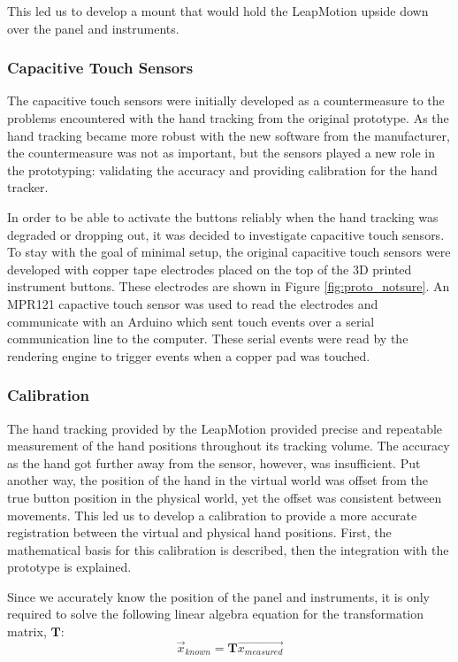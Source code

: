 This led us to develop a mount that would hold the LeapMotion upside down over the panel and instruments.

\subsubsection{Capacitive Touch Sensors}

The capacitive touch sensors were initially developed as a countermeasure to the problems encountered with the hand tracking from the original prototype.
As the hand tracking became more robust with the new software from the manufacturer, the countermeasure was not as important, but the sensors played a new role in the prototyping: validating the accuracy and providing calibration for the hand tracker.

In order to be able to activate the buttons reliably when the hand tracking was degraded or dropping out, it was decided to investigate capacitive touch sensors.
To stay with the goal of minimal setup, the original capacitive touch sensors were developed with copper tape electrodes placed on the top of the 3D printed instrument buttons.
These electrodes are shown in Figure \ref{fig:proto_notsure}.
An MPR121 capactive touch sensor was used to read the electrodes and communicate with an Arduino which sent touch events over a serial communication line to the computer.
These serial events were read by the rendering engine to trigger events when a copper pad was touched.


\subsubsection{Calibration}

The hand tracking provided by the LeapMotion provided precise and repeatable measurement of the hand positions throughout its tracking volume.
The accuracy as the hand got further away from the sensor, however, was insufficient.
Put another way, the position of the hand in the virtual world was offset from the true button position in the physical world, yet the offset was consistent between movements.
This led us to develop a calibration to provide a more accurate registration between the virtual and physical hand positions.
First, the mathematical basis for this calibration is described, then the integration with the prototype is explained.

Since we accurately know the position of the panel and instruments, it is only required to solve the following linear algebra equation for the transformation matrix, $\mathbf{T}$:
\begin{equation}
    \vec{x}_{known} = \mathbf{T}\vec{x_{measured}}
    \label{eq:proto_Tvec}
\end{equation}

